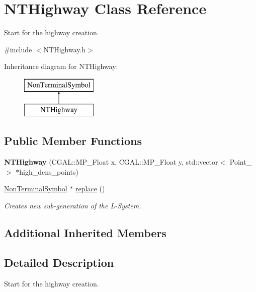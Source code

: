 \hypertarget{class_n_t_highway}{}\section{N\+T\+Highway Class Reference}
\label{class_n_t_highway}


Start for the highway creation.  




{\ttfamily \#include $<$N\+T\+Highway.\+h$>$}

Inheritance diagram for N\+T\+Highway\+:\begin{figure}[H]
\begin{center}
\leavevmode
\includegraphics[height=2.000000cm]{class_n_t_highway}
\end{center}
\end{figure}
\subsection*{Public Member Functions}
\begin{DoxyCompactItemize}
\item 
\hypertarget{class_n_t_highway_aa71c2a81df557af649ed3a0562615526}{}\label{class_n_t_highway_aa71c2a81df557af649ed3a0562615526} 
{\bfseries N\+T\+Highway} (C\+G\+A\+L\+::\+M\+P\+\_\+\+Float x, C\+G\+A\+L\+::\+M\+P\+\_\+\+Float y, std\+::vector$<$ Point\+\_ $>$ $\ast$high\+\_\+dens\+\_\+points)
\item 
\hyperlink{class_non_terminal_symbol}{Non\+Terminal\+Symbol} $\ast$ \hyperlink{class_n_t_highway_a5a33cf5f76b36a1d62685408306a54c9}{replace} ()
\begin{DoxyCompactList}\small\item\em Creates new sub-\/generation of the L-\/\+System. \end{DoxyCompactList}\end{DoxyCompactItemize}
\subsection*{Additional Inherited Members}


\subsection{Detailed Description}
Start for the highway creation. 

